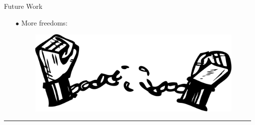 \documentclass[aspectratio=169,usenames,dvipsnames]{beamer}
\begin{document}
\begin{frame}{Future Work}
\begin{itemize}
\begin{figure}
{  ~~~
  \begin{axopicture}(10,80)
    \Line(0,40)(10,40)
    \Line(5,35)(5,45)
  \end{axopicture} \hspace{10mm}
  ~~~
  \begin{axopicture}(80,80)
    \DoublePhoton(40,40)(75,75){2}{6}{2}
    \DoublePhoton(40,40)(5,75){2}{6}{2}
    \DoublePhoton(40,40)(0,40){2}{6}{2}
    \DoublePhoton(40,40)(80,40){2}{6}{2}
    \DoublePhoton(40,40)(5,5){2}{6}{2}
    \DoublePhoton(40,40)(75,5){2}{6}{2}
    \Vertex(40,40){3}
  \end{axopicture} \hspace{10mm}
  ~~~
  \begin{axopicture}(10,80)
    \Line(0,40)(10,40)
    \Line(5,35)(5,45)
  \end{axopicture}
  ~~~
  \begin{axopicture}(80,80)
    \Vertex(25,40){2}
    \Vertex(40,40){2}
    \Vertex(55,40){2}
  \end{axopicture}}
\end{figure}

\vspace{1mm}
 \item[$\bullet$] {\small More freedoms:} \\
\begin{figure}
  \centering
  \includegraphics[scale=0.06]{images/freedom.jpg}  
\end{figure}
\end{itemize}

\textcolor{LUCopper}{\rule{\textwidth}{1pt}}

\vspace{100mm}
\end{frame}
\end{document}
